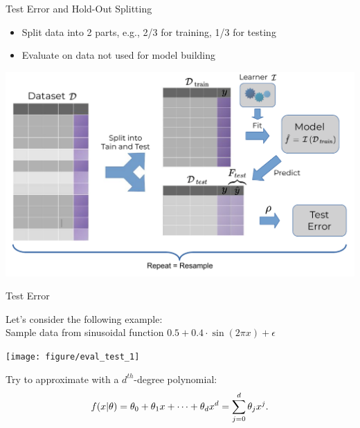 \begin{vbframe}{Test Error and Hold-Out Splitting}
\begin{itemize}
  \item Split data into 2 parts, e.g., 2/3 for training, 1/3 for testing
  \item Evaluate on data not used for model building
\end{itemize}

\includegraphics[width=\textwidth]{figure_man/test_error.pdf}

\end{vbframe}

\begin{vbframe}{Test Error}

Let's consider the following example:\\
Sample data from sinusoidal function
$0.5 + 0.4 \cdot \sin (2 \pi x) + \epsilon$\\
\lz
\begin{knitrout}\scriptsize
{}\color{fgcolor}

{\centering \texttt{[image: figure/eval\_test\_1]} 

}



\end{knitrout}
Try to approximate with a $d^{th}$-degree polynomial:
\[ f(x | \theta) = \theta_0 + \theta_1 x + \cdots + \theta_d x^d = \sum_{j = 0}^{d} \theta_j x^j\text{.} \]
\end{vbframe}


